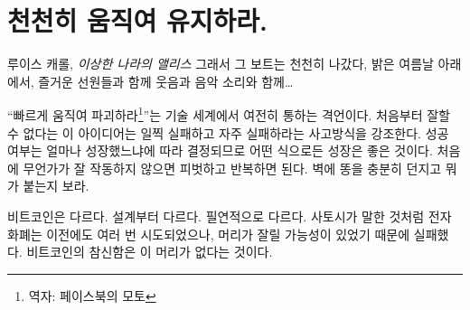 \chapter{천천히 움직여 유지하라.}
\label{les:18}

\begin{chapquote}{루이스 캐롤, \textit{이상한 나라의 앨리스}}
	그래서 그 보트는 천천히 나갔다, 밝은 여름날 아래에서, 즐거운 선원들과 함께 웃음과 음악 소리와 함께\ldots
\end{chapquote}

\begin{comment}
	It might be a dead mantra, but \enquote{move fast and break things} is still how
	much of the tech world operates. The idea that it doesn't matter if you
	get things right the first time is a basic pillar of the \textit{fail early,
		fail often} mentality. Success is measured in growth, so as long as you
	are growing everything is fine. If something doesn't work at first you
	simply pivot and iterate. In other words: throw enough shit against the
	wall and see what sticks.
\end{comment}
\enquote{빠르게 움직여 파괴하라\footnote{역자: 페이스북의 모토}}는 기술 세계에서 여전히 통하는 격언이다.
처음부터 잘할 수 없다는 이 아이디어는 일찍 실패하고 자주 실패하라는 사고방식을 강조한다.
성공 여부는 얼마나 성장했느냐에 따라 결정되므로 어떤 식으로든 성장은 좋은 것이다. 
처음에 무언가가 잘 작동하지 않으면 피벗하고 반복하면 된다. 
벽에 똥을 충분히 던지고 뭐가 붙는지 보라.

\begin{comment}
	Bitcoin is very different. It is different by design. It is different
	out of necessity. As Satoshi pointed out, e-currency has been tried
	many times before, and all previous attempts have failed because there
	was a head which could be cut off. The novelty of Bitcoin is that it is
	a beast without heads.
\end{comment}
비트코인은 다르다. 설계부터 다르다. 필연적으로 다르다.
사토시가 말한 것처럼 전자 화폐는 이전에도 여러 번 시도되었으나, 
머리가 잘릴 가능성이 있었기 때문에 실패했다.
비트코인의 참신함은 이 머리가 없다는 것이다.

